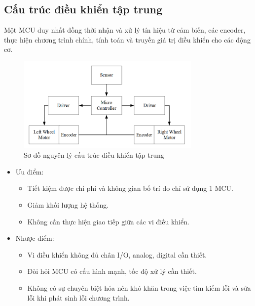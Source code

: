         \subsection{Cấu trúc điều khiển tập trung}
        \hspace*{0.6cm}Một MCU duy nhất đồng thời nhận và xử lý tín hiệu từ cảm biến, các encoder,
        thực hiện chương trình chính, tính toán và truyền giá trị điều khiển cho các động cơ.
        \begin{figure}[H]
            \centering
            \includegraphics[width=0.8\textwidth]{pictures/chapter1/chapter1_pic20_taptrung.png}
            \caption{Sơ đồ nguyên lý cấu trúc điều khiển tập trung}
            \label{chap1_pic20}
        \end{figure}
        \begin{itemize}
            \item Ưu điểm: 
            \begin{itemize}[label=\textendash]
                \item Tiết kiệm được chi phí và không gian bố trí do chỉ sử dụng 1 MCU.
                \item Giảm khối lượng hệ thống.
                \item Không cần thực hiện giao tiếp giữa các vi điều khiển.
            \end{itemize}
            \item Nhược điểm: 
            \begin{itemize}[label=\textendash]
                \item Vi điều khiển không đủ chân I/O, analog, digital cần thiết.
                \item Đòi hỏi MCU có cấu hình mạnh, tốc độ xử lý cần thiết.
                \item Không có sự chuyên biệt hóa nên khó khăn trong việc tìm kiếm lỗi và sửa lỗi khi
                phát sinh lỗi chương trình.
            \end{itemize}
        \end{itemize}



